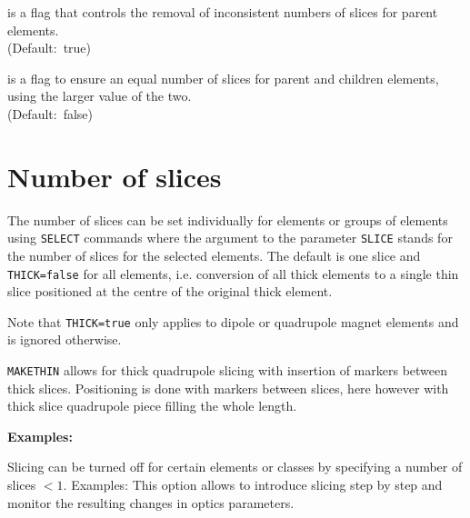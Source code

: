 \begin{madlist}
    is a flag that controls the removal of
   inconsistent numbers of slices for parent elements. \\
   (Default:~true)

    is a flag to ensure an equal number of slices
   for parent and children elements, using the larger value of the two. \\
   (Default:~false)

\end{madlist}

\section{Number of slices}

The number of slices can be set individually for elements or groups of
elements using \texttt{SELECT} commands
where the argument to the parameter \texttt{SLICE} stands for the number of
slices for the selected elements. The default is one slice and
\texttt{THICK=false} for all elements, i.e. conversion of all thick
elements to a single thin slice positioned at the centre of the original
thick element.

Note that \texttt{THICK=true} only applies to dipole or quadrupole magnet
elements and is ignored otherwise.  

\texttt{MAKETHIN} allows for thick quadrupole slicing with insertion of
markers between thick slices. Positioning is done with markers between
slices, here however with thick slice quadrupole piece filling the whole
length.
  
{\bf Examples:}


Slicing can be turned off for certain elements or classes by specifying
a number of slices $< 1$. Examples: 
This option allows to introduce slicing step by step and monitor the 
resulting changes in optics parameters.

